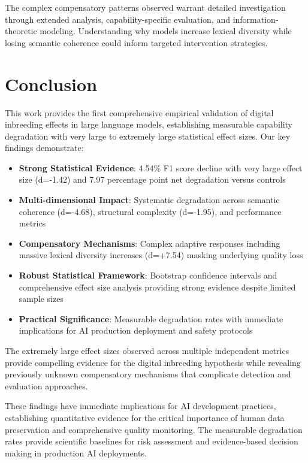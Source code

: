 \documentclass[11pt]{article}
\begin{document}
The complex compensatory patterns observed warrant detailed investigation through extended analysis, capability-specific evaluation, and information-theoretic modeling. Understanding why models increase lexical diversity while losing semantic coherence could inform targeted intervention strategies.

\section{Conclusion}

This work provides the first comprehensive empirical validation of digital inbreeding effects in large language models, establishing measurable capability degradation with very large to extremely large statistical effect sizes. Our key findings demonstrate:

\begin{itemize}
    \item \textbf{Strong Statistical Evidence}: 4.54\% F1 score decline with very large effect size (d=-1.42) and 7.97 percentage point net degradation versus controls
    \item \textbf{Multi-dimensional Impact}: Systematic degradation across semantic coherence (d=-4.68), structural complexity (d=-1.95), and performance metrics
    \item \textbf{Compensatory Mechanisms}: Complex adaptive responses including massive lexical diversity increases (d=+7.54) masking underlying quality loss
    \item \textbf{Robust Statistical Framework}: Bootstrap confidence intervals and comprehensive effect size analysis providing strong evidence despite limited sample sizes
    \item \textbf{Practical Significance}: Measurable degradation rates with immediate implications for AI production deployment and safety protocols
\end{itemize}

The extremely large effect sizes observed across multiple independent metrics provide compelling evidence for the digital inbreeding hypothesis while revealing previously unknown compensatory mechanisms that complicate detection and evaluation approaches.

These findings have immediate implications for AI development practices, establishing quantitative evidence for the critical importance of human data preservation and comprehensive quality monitoring. The measurable degradation rates provide scientific baselines for risk assessment and evidence-based decision making in production AI deployments.
\end{document}
